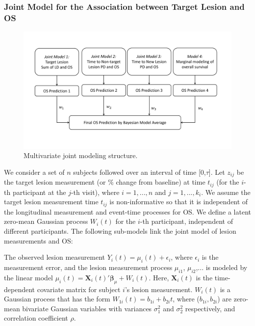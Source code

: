 \subsubsection{Joint Model for the Association between Target Lesion and OS} \label{sec:TL}


\begin{figure}
\centering
\includegraphics[width=\textwidth]{chapters/figures/JM.pdf}
\caption{Multivariate joint modeling structure.} 
\label{fig:JM}
\end{figure}


We consider a set of $n$ subjects followed over an interval of time [0,$\tau$]. Let $z_{ij}$ be the target lesion measurement (or \% change from baseline) at time $t_{ij}$ (for the $i$-th participant at the $j$-th visit), where $i=1,...,n$ and $j=1,...,k_i$. We assume the target lesion measurement time $t_{ij}$ is non-informative so that it is independent of the longitudinal measurement and event-time processes for OS. We define a latent zero-mean Gaussian process $W_i(t)$ for the $i$-th participant, independent of different participants. The following sub-models link the joint model of lesion measurements and OS:

The observed lesion measurement
$Y_{i}(t)=\mu_{i}(t)+\epsilon_i$,
where $\epsilon_i$ is the measurement error, and the lesion measurement process $\mu_{i1}$, $\mu_{i2}$,...
is modeled by the linear model
$\mu_{i}(t)=\textbf{X}_i(t)' \boldsymbol{\beta}_{\mu}+W_{i}(t)$. Here, $\textbf{X}_i(t)$ is the time-dependent covariate matrix for subject $i$'s lesion measurement. $W_i(t)$ is a Gaussian process that has the form $W_{1i}(t)=b_{1i}+b_{2i}t$,
where ($b_{1i},b_{2i}$) are zero-mean bivariate Gaussian variables with variances $\sigma_1^2$ and $\sigma_2^2$ respectively, and correlation coefficient $\rho$. 

